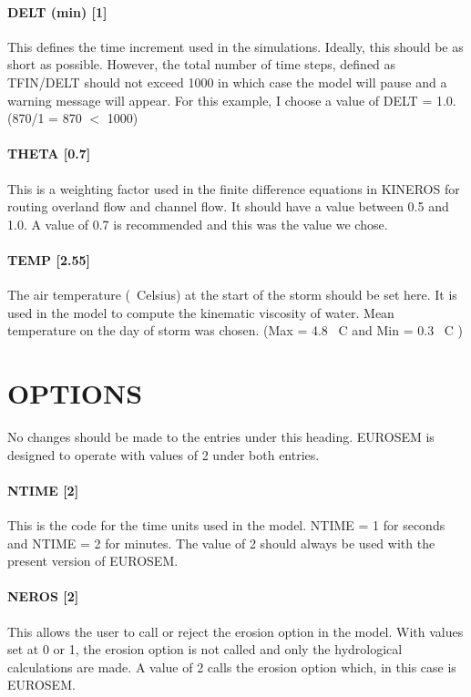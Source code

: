 \paragraph{DELT (min) [1]}
This defines the time increment used in the simulations. Ideally, this should
be as short as possible. However, the total number of time steps, defined as
TFIN/DELT should not exceed 1000 in which case the model will pause and a
warning message will appear. For this example, I choose a value of DELT = 1.0.
(870/1 = 870 $<$ 1000)
 
\paragraph{THETA [0.7]}
This is a weighting factor used in the finite difference equations in KINEROS
for routing overland flow and channel flow. It should have a value between 0.5
and 1.0. A value of 0.7 is recommended and this was the value we chose.
 
\paragraph{TEMP [2.55]}
The air temperature (\textdegree\ Celsius) at the start of the storm should be
set here. It is used in the model to compute the kinematic viscosity of water.
Mean temperature on the day of storm was chosen. (Max = 4.8 \textdegree\ C and
Min = 0.3 \textdegree\ C )
 
\section{OPTIONS}
\label{sec:OPTIONS}

No changes should be made to the entries under this heading.
EUROSEM is designed to operate with values of 2 under both entries.
 
\paragraph{NTIME [2]}
This is the code for the time units used in the model. NTIME = 1 for seconds
and NTIME = 2 for minutes. The value of 2 should always be used with the present
version of EUROSEM.
 
\paragraph{NEROS [2]}
This allows the user to call or reject the erosion option in the model. With
values set at 0 or 1, the erosion option is not called and only the hydrological
calculations are made. A value of 2 calls the erosion option which, in this case
is EUROSEM.
 
